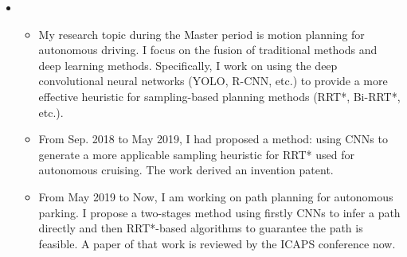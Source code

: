   \begin{itemize}[leftmargin=*]



    \item {}
    {\small
     \begin{itemize}
         \item{My research topic during the Master period is motion planning for autonomous driving. I focus on the
         	fusion of traditional methods and deep learning methods. Specifically, I work on using the deep
         	convolutional neural networks (YOLO, R-CNN, etc.) to provide a more effective heuristic for
         	sampling-based planning methods (RRT*, Bi-RRT*, etc.).}
         \item{From Sep. 2018 to May 2019, I had proposed a method: using CNNs to generate a more applicable
         	sampling heuristic for RRT* used for autonomous cruising. The work derived an invention patent.}
         \item{From May 2019 to Now, I am working on path planning for autonomous parking. I propose a two-stages method using firstly CNNs to infer a path
         	directly and then RRT*-based algorithms to guarantee the path is feasible. A paper of that work is
         	reviewed by the ICAPS conference now.}
     \end{itemize}
    }

  \end{itemize}
